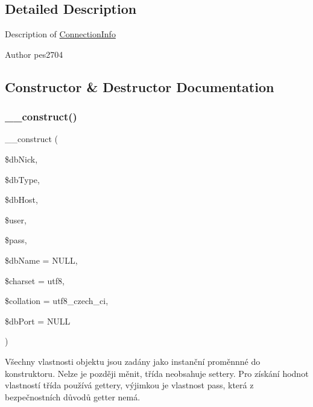 \subsection{Detailed Description}
Description of \mbox{\hyperlink{class_pes_1_1_database_1_1_handler_1_1_connection_info}{Connection\+Info}}

\begin{DoxyAuthor}{Author}
pes2704 
\end{DoxyAuthor}


\subsection{Constructor \& Destructor Documentation}
\mbox{\label{class_pes_1_1_database_1_1_handler_1_1_connection_info_a781e3c770ff984c6c0163cc88652351b}} 
\subsubsection{\texorpdfstring{\+\_\+\+\_\+construct()}{\_\_construct()}}
{\footnotesize\ttfamily \+\_\+\+\_\+construct (\begin{DoxyParamCaption}\item[{}]{\$db\+Nick,  }\item[{}]{\$db\+Type,  }\item[{}]{\$db\+Host,  }\item[{}]{\$user,  }\item[{}]{\$pass,  }\item[{}]{\$db\+Name = {\ttfamily NULL},  }\item[{}]{\$charset = {\ttfamily \textquotesingle{}utf8\textquotesingle{}},  }\item[{}]{\$collation = {\ttfamily \textquotesingle{}utf8\+\_\+czech\+\_\+ci\textquotesingle{}},  }\item[{}]{\$db\+Port = {\ttfamily NULL} }\end{DoxyParamCaption})}

Všechny vlastnosti objektu jsou zadány jako instanční proměnnné do konstruktoru. Nelze je později měnit, třída neobsahuje settery. Pro získání hodnot vlastností třída používá gettery, výjimkou je vlastnost pass, která z bezpečnostních důvodů getter nemá. 


